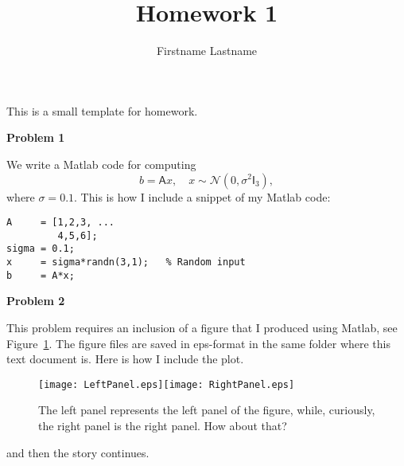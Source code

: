 \documentclass{article}
\title{Homework 1}
\author{Firstname Lastname}
\begin{document}
\maketitle

This is a small template for homework. 

\bigskip
{\Large {\bf Problem 1}}
\bigskip

We write a Matlab code for computing
\[
 b = {\mathsf A}x,\quad x\sim{\mathcal N}(0,\sigma^2{\mathsf I}_3),
\]
where $\sigma = 0.1$. This is how I include a snippet of my Matlab code:

\begin{verbatim}
A     = [1,2,3, ...
         4,5,6];
sigma = 0.1;
x     = sigma*randn(3,1);   % Random input
b     = A*x;
\end{verbatim}

\bigskip
{\Large {\bf Problem 2}}
\bigskip

This problem requires an inclusion of a figure that I produced using Matlab, see Figure~\ref{fig:my figure}. The figure files are saved in eps-format in the same folder where this text document is. Here is how I include the plot.

\begin{figure}[h!]
\centerline{
\texttt{[image: LeftPanel.eps]}\texttt{[image: RightPanel.eps]}
}
\caption{\label{fig:my figure}The left panel represents the left panel of the figure, while, curiously, the right panel is the right panel. How about that?}
\end{figure}

and then the story continues.
\end{document}
